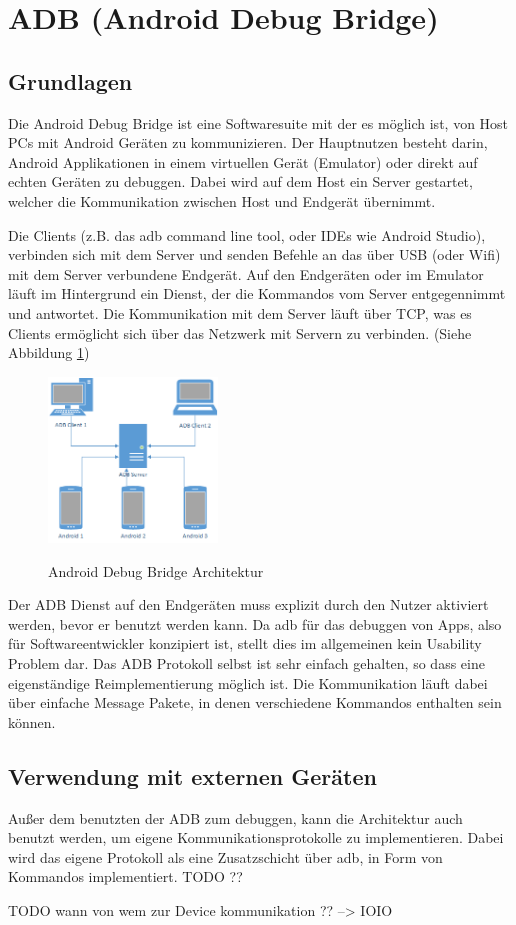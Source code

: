 \section{ADB (Android Debug Bridge)}
\subsection{Grundlagen}
Die Android Debug Bridge ist eine Softwaresuite mit der es möglich ist, von Host PCs mit Android Geräten zu kommunizieren.
Der Hauptnutzen besteht darin, Android Applikationen in einem virtuellen Gerät (Emulator) oder direkt auf echten Geräten zu debuggen.
Dabei wird auf dem Host ein Server gestartet, welcher die Kommunikation zwischen Host und Endgerät übernimmt. 

Die Clients (z.B. das adb command line tool, oder IDEs wie Android Studio), verbinden sich mit dem Server und senden Befehle an das über USB (oder Wifi) mit dem Server verbundene Endgerät.
Auf den Endgeräten oder im Emulator läuft im Hintergrund ein Dienst, der die Kommandos vom Server entgegennimmt und antwortet. Die Kommunikation mit dem Server läuft über TCP,
was es Clients ermöglicht sich über das Netzwerk mit Servern zu verbinden. (Siehe Abbildung \ref{adb})
\begin{figure}
	\centering
	\caption{Android Debug Bridge Architektur}
	\includegraphics[width=0.4\textwidth]{media/adb.png}	
	\label{adb}
\end{figure}

Der ADB Dienst auf den Endgeräten muss explizit durch den Nutzer aktiviert werden, bevor er benutzt werden kann.
Da adb für das debuggen von Apps, also für Softwareentwickler konzipiert ist, stellt dies im allgemeinen kein Usability Problem dar. 
Das ADB Protokoll selbst ist sehr einfach gehalten, so dass eine eigenständige Reimplementierung möglich ist.
Die Kommunikation läuft dabei über einfache Message Pakete, in denen verschiedene Kommandos enthalten sein können.
\lstset{language=C,
	basicstyle=\ttfamily\scriptsize
}

  

\subsection{Verwendung mit externen Geräten}
Außer dem benutzten der ADB zum debuggen, kann die Architektur auch benutzt werden, um eigene Kommunikationsprotokolle zu implementieren.
Dabei wird das eigene Protokoll als eine Zusatzschicht über adb, in Form von Kommandos implementiert. TODO ??


TODO wann von wem zur Device kommunikation ?? --> IOIO

